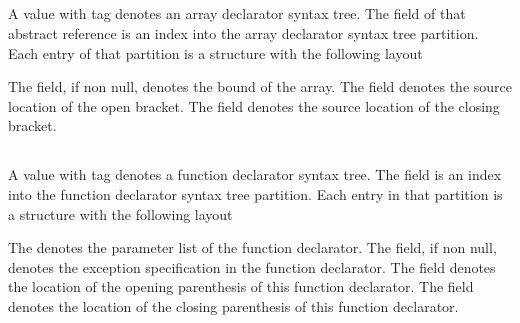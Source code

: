 \subsection{}
\label{sec:ifc:SyntaxSort:ArrayDeclarator}

A  value with tag  denotes an array declarator syntax tree.
The  field of that abstract reference is an index into the array declarator syntax tree partition.
Each entry of that partition is a structure with the following layout
%
\begin{figure}[H]
	\centering
	\label{fig:ifc:SyntaxSort:ArrayDeclarator}
\end{figure}
%
The  field, if non null, denotes the bound of the array.
The  field denotes the source location of the open bracket.
The  field denotes the source location of the closing bracket.


\subsection{}
\label{sec:ifc:SyntaxSort:FunctionDeclarator}


A  value with tag  denotes a function declarator syntax tree.
The  field is an index into the function declarator syntax tree partition.
Each entry in that partition is a structure with the following layout
%
\begin{figure}[H]
	\centering
	\label{fig:ifc:SyntaxSort:FunctionDeclarator}
\end{figure}
%
The  denotes the parameter list of the function declarator.
The  field, if non null, denotes the exception specification in the function declarator.
The  field denotes the location of the opening parenthesis of this function declarator.
The  field denotes the location of the closing parenthesis of this function declarator.

